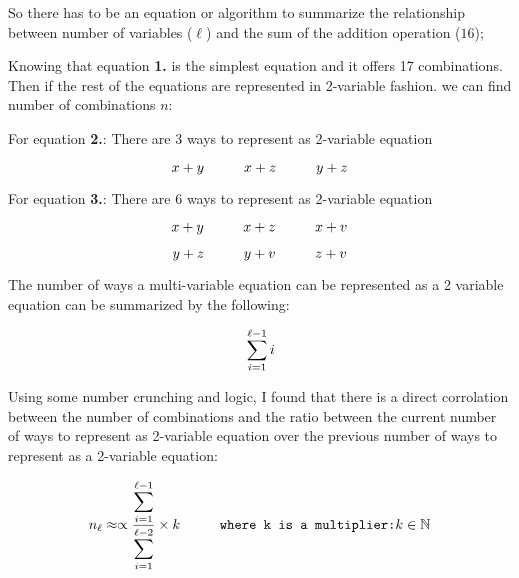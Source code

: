 \documentclass[fleqn, a4paper,12pt]{article}
\begin{document}
So there has to be an equation or algorithm to summarize the relationship between number of variables ($\ell$) and the sum of the addition operation ($16$);

Knowing that equation \textbf{1.} is the simplest equation and it offers 17 combinations. Then if the rest of the equations are represented in 2-variable fashion. we can find number of combinations $n$:

For equation \textbf{2.}: There are 3 ways to represent as 2-variable equation
\begin{center}
\[
\hspace*{\fill} x + y \hspace{1cm} x + z \hspace{1cm} y + z \hspace*{\fill}
\]
\end{center}

For equation \textbf{3.}: There are 6 ways to represent as 2-variable equation
\begin{center}
\[
\hspace*{\fill} x + y \hspace{1cm} x + z \hspace{1cm} x + v \hspace*{\fill}
\]
\end{center}
\begin{center}
\[
\hspace*{\fill} y + z \hspace{1cm} y + v \hspace{1cm} z + v \hspace*{\fill}
\]
\end{center}

The number of ways a multi-variable equation can be represented as a 2 variable equation can be summarized by the following:

\[
\\ \sum_{i=1}^{\ell-1} i
\]

Using some number crunching and logic, I found that there is a direct corrolation between the number of combinations and the ratio between the current number of ways to represent as 2-variable equation over the previous number of ways to represent as a 2-variable equation:

\[
		\\ n_\ell \approx \propto \frac{\displaystyle \sum_{i=1}^{\ell-1}}{\displaystyle \sum_{i=1}^{\ell-2}} \times k \hspace{1cm} \texttt{where k is a multiplier:} k \in \mathbb{N} 
\]
\end{document}
